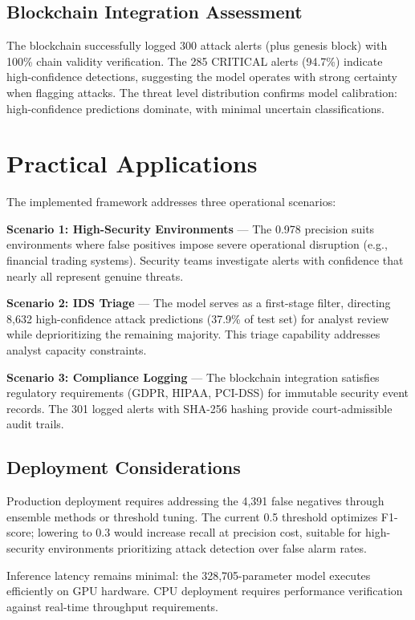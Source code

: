 \documentclass[12pt,a4paper]{report}
\begin{document}
\subsection{Blockchain Integration Assessment}

The blockchain successfully logged 300 attack alerts (plus genesis block) with 100\% chain validity verification. The 285 CRITICAL alerts (94.7\%) indicate high-confidence detections, suggesting the model operates with strong certainty when flagging attacks. The threat level distribution confirms model calibration: high-confidence predictions dominate, with minimal uncertain classifications.

\section{Practical Applications}

The implemented framework addresses three operational scenarios:

\textbf{Scenario 1: High-Security Environments} --- The 0.978 precision suits environments where false positives impose severe operational disruption (e.g., financial trading systems). Security teams investigate alerts with confidence that nearly all represent genuine threats.

\textbf{Scenario 2: IDS Triage} --- The model serves as a first-stage filter, directing 8,632 high-confidence attack predictions (37.9\% of test set) for analyst review while deprioritizing the remaining majority. This triage capability addresses analyst capacity constraints.

\textbf{Scenario 3: Compliance Logging} --- The blockchain integration satisfies regulatory requirements (GDPR, HIPAA, PCI-DSS) for immutable security event records. The 301 logged alerts with SHA-256 hashing provide court-admissible audit trails.

\subsection{Deployment Considerations}

Production deployment requires addressing the 4,391 false negatives through ensemble methods or threshold tuning. The current 0.5 threshold optimizes F1-score; lowering to 0.3 would increase recall at precision cost, suitable for high-security environments prioritizing attack detection over false alarm rates.

Inference latency remains minimal: the 328,705-parameter model executes efficiently on GPU hardware. CPU deployment requires performance verification against real-time throughput requirements.
\end{document}
